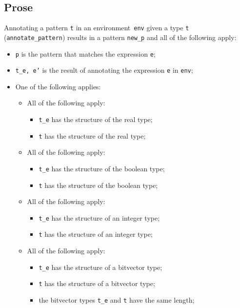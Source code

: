 \documentclass{book}
\begin{document}
    \subsection{Prose}
      Annotating a pattern \texttt{t} in an environment~\texttt{env} given a type \texttt{t} (\texttt{annotate\_pattern}) results in a pattern \texttt{new\_p} and all of the following apply:
      \begin{itemize}
        \item \texttt{p} is the pattern that matches the expression \texttt{e};
        \item \texttt{t\_e, e'} is the result of annotating the expression \texttt{e} in \texttt{env};
        \item One of the following applies:
          \begin{itemize}
            \item All of the following apply:
              \begin{itemize}
                \item \texttt{t\_e} has the structure of the real type;
                \item \texttt{t} has the structure of the real type;
              \end{itemize}
            \item All of the following apply:
              \begin{itemize}
                \item \texttt{t\_e} has the structure of the boolean type;
                \item \texttt{t} has the structure of the boolean type;
              \end{itemize}
            \item All of the following apply:
              \begin{itemize}
                \item \texttt{t\_e} has the structure of an integer type;
                \item \texttt{t} has the structure of an integer type;
              \end{itemize}
            \item All of the following apply:
              \begin{itemize}
                \item \texttt{t\_e} has the structure of a bitvector type;
                \item \texttt{t} has the structure of a bitvector type;
                \item the bitvector types \texttt{t\_e} and \texttt{t} have the same length;

\end{itemize}
\end{itemize}
\end{itemize}
\end{document}
